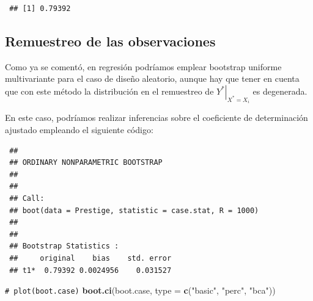 \documentclass[
  spanish,
  10pt,
]{book}
\newenvironment{Shaded}{\begin{snugshade}}{\end{snugshade}}
\newcommand{\AttributeTok}[1]{\textcolor[rgb]{0.13,0.29,0.53}{#1}}
\newcommand{\CommentTok}[1]{\textcolor[rgb]{0.56,0.35,0.01}{\textit{#1}}}
\newcommand{\ControlFlowTok}[1]{\textcolor[rgb]{0.13,0.29,0.53}{\textbf{#1}}}
\newcommand{\DecValTok}[1]{\textcolor[rgb]{0.00,0.00,0.81}{#1}}
\newcommand{\FunctionTok}[1]{\textcolor[rgb]{0.13,0.29,0.53}{\textbf{#1}}}
\newcommand{\NormalTok}[1]{#1}
\newcommand{\OtherTok}[1]{\textcolor[rgb]{0.56,0.35,0.01}{#1}}
\newcommand{\SpecialCharTok}[1]{\textcolor[rgb]{0.81,0.36,0.00}{\textbf{#1}}}
\newcommand{\StringTok}[1]{\textcolor[rgb]{0.31,0.60,0.02}{#1}}
\theoremstyle{break}
\theoremstyle{nonumberplain}
\renewcommand{\CommentTok}[1]{\textcolor[rgb]{0.41,0.41,0.41}{\texttt{#1}}}
\begin{document}
\begin{verbatim}
 ## [1] 0.79392
\end{verbatim}

\subsection{Remuestreo de las observaciones}\label{boot-unif-reg}

Como ya se comentó, en regresión podríamos emplear bootstrap uniforme multivariante para el caso de diseño aleatorio, aunque hay que tener en cuenta que con este método la distribución en el remuestreo de \(\left. Y^{\ast}\right\vert _{X^{\ast}=X_i}\) es degenerada.

En este caso, podríamos realizar inferencias sobre el coeficiente de determinación ajustado empleando el siguiente código:

\begin{Shaded}
\end{Shaded}

\begin{verbatim}
 ## 
 ## ORDINARY NONPARAMETRIC BOOTSTRAP
 ## 
 ## 
 ## Call:
 ## boot(data = Prestige, statistic = case.stat, R = 1000)
 ## 
 ## 
 ## Bootstrap Statistics :
 ##     original    bias    std. error
 ## t1*  0.79392 0.0024956    0.031527
\end{verbatim}

\begin{Shaded}
\begin{Highlighting}[]
\CommentTok{\# plot(boot.case)}
\FunctionTok{boot.ci}\NormalTok{(boot.case, }\AttributeTok{type =} \FunctionTok{c}\NormalTok{(}\StringTok{"basic"}\NormalTok{, }\StringTok{"perc"}\NormalTok{, }\StringTok{"bca"}\NormalTok{))}
\end{Highlighting}
\end{Shaded}
\end{document}
